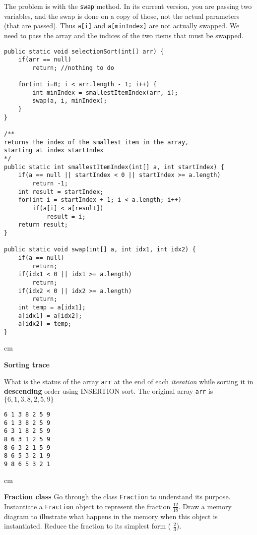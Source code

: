 \begin{questions}
\begin{solution}
The problem is with the \texttt{swap} method. In its current version, you are passing two variables, and the swap is done on a copy of those, not the actual parameters (that are passed). Thus \texttt{a[i]} and \texttt{a[minIndex]} are not actually swapped. We need to pass the array and the indices of the two items that must be swapped.

\begin{lstlisting}
public static void selectionSort(int[] arr) {
	if(arr == null)
		return; //nothing to do
		
	for(int i=0; i < arr.length - 1; i++) {
		int minIndex = smallestItemIndex(arr, i);
		swap(a, i, minIndex);
	}
}

/**
returns the index of the smallest item in the array,
starting at index startIndex
*/
public static int smallestItemIndex(int[] a, int startIndex) {
	if(a == null || startIndex < 0 || startIndex >= a.length)
		return -1;
	int result = startIndex;
	for(int i = startIndex + 1; i < a.length; i++)
		if(a[i] < a[result])
			result = i;
	return result;
}

public static void swap(int[] a, int idx1, int idx2) {
	if(a == null)
		return;
	if(idx1 < 0 || idx1 >= a.length)
		return;
	if(idx2 < 0 || idx2 >= a.length)
		return;
	int temp = a[idx1];
	a[idx1] = a[idx2];
	a[idx2] = temp;
}
\end{lstlisting}
\end{solution}

 cm

\question  \textbf{Sorting trace} \vskip 0.5cm

What is the status of the array \texttt{arr} at the end of each \emph{iteration} while sorting it in \textbf{descending} order using INSERTION sort. The original array \texttt{arr} is $\{6, 1, 3, 8, 2, 5, 9\}$

\begin{solution}
\begin{verbatim}
6 1 3 8 2 5 9
6 1 3 8 2 5 9
6 3 1 8 2 5 9
8 6 3 1 2 5 9
8 6 3 2 1 5 9
8 6 5 3 2 1 9
9 8 6 5 3 2 1
\end{verbatim}
\end{solution}

 cm

\question  \textbf{Fraction class} \vskip 0.5cm
Go through the class \texttt{Fraction} to understand its purpose. Instantiate a \texttt{Fraction} object to represent the fraction $\frac{12}{18}$. Draw a memory diagram to illustrate what happens in the memory when this object is instantiated. Reduce the fraction to its simplest form ( $\frac{2}{3}$).


\end{questions}

